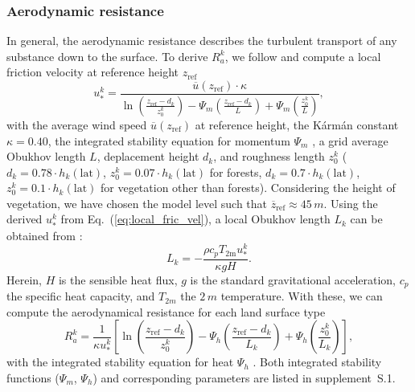\documentclass[gmd, manuscript]{copernicus}
\begin{document}
\subsubsection{Aerodynamic resistance}
\label{subsubsec:Ra}
In general, the aerodynamic resistance describes the turbulent transport of any substance down to the surface. To derive $R_a^k$, we follow \citet{WASP:Simpson2003,ACP:Simpson2012} and compute a local friction velocity at reference height $z_\mathrm{ref}$ \citep[Eq.~(52),][]{ACP:Simpson2012}
\begin{equation}
  u_*^k = \frac{\overline{u}(z_\mathrm{ref})\cdot\kappa}{\ln{(\frac{z_\mathrm{ref}-d_k}{z_0^k})}-\Psi_m(\frac{z_\mathrm{ref}-d_k}{L})+\Psi_m(\frac{z_0^k}{L})},
  \label{eq:local_fric_vel}
\end{equation}
with the average wind speed $\overline{u}(z_\mathrm{ref})$ at reference height, the K\'{a}rm\'{a}n constant $\kappa = 0.40$, the integrated stability equation for momentum $\Psi_m$ \citep[e.g.,][]{Garratt1992}, a grid average Obukhov length $L$, deplacement height $d_k$, and roughness length $z_0^k$ ($d_k=0.78\cdot h_k(\mathrm{lat})$, $z_0^k=0.07\cdot h_k(\mathrm{lat})$ for forests, $d_k=0.7\cdot h_k(\mathrm{lat})$, $z_0^k=0.1\cdot h_k(\mathrm{lat})$ for vegetation other than forests). Considering the height of vegetation, we have chosen the model level such that $\overline{z}_\mathrm{ref}\approx 45\,\unit{m}$. Using the derived $u_*^k$ from Eq.~(\ref{eq:local_fric_vel}), a local Obukhov length $L_k$ can be obtained from \citep[Eq.~(8),][]{ACP:Simpson2012}:
\begin{equation}
  L_k = - \frac{\rho c_p T_\mathrm{2m} u_*^k}{\kappa g H}.
\end{equation}
Herein, $H$ is the sensible heat flux, $g$ is the standard gravitational acceleration, $c_p$ the specific heat capacity, and $T_{2m}$ the $2\,\unit{m}$ temperature. With these, we can compute the aerodynamical resistance for each land surface type \citep[Eq.~(8.8),][]{WASP:Simpson2003}
\begin{equation}
  R_a^k = \frac{1}{\kappa u_*^k}\left[{\ln{\left(\frac{z_\mathrm{ref}-d_k}{z_0^k}\right)}-\Psi_h\left(\frac{z_\mathrm{ref}-d_k}{L_k}\right)+\Psi_h\left(\frac{z_0^k}{L_k}\right)}\right],
\end{equation}
with the integrated stability equation for heat $\Psi_h$ \citep[e.g.,][]{Garratt1992}. Both integrated stability functions ($\Psi_m$, $\Psi_h$) and corresponding parameters are listed in supplement~S.1.
\end{document}
